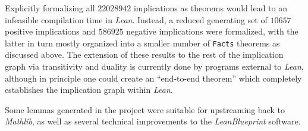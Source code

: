 Explicitly formalizing all $\num{22028942}$ implications as theorems would lead to an infeasible compilation time in  \emph{Lean}.  Instead, a reduced generating set of $\num{10657}$ positive implications and $\num{586925}$ negative implications were formalized, with the latter in turn mostly organized into a smaller number of \texttt{Facts} theorems as discussed above.  The extension of these results to the rest of the implication graph via transitivity and duality is currently done by programs external to \emph{Lean}, although in principle one could create an ``end-to-end theorem'' which completely establishes the implication graph within \emph{Lean}.

Some lemmas generated in the project were suitable for upstreaming back to \emph{Mathlib}, as well as several technical improvements to the \emph{LeanBlueprint} software.
